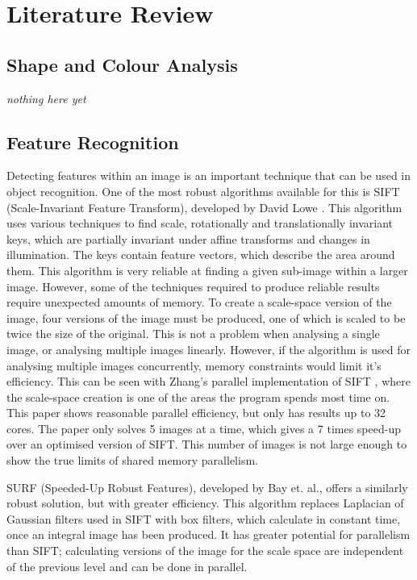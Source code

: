 \documentclass[../main.tex]{subfiles}
\begin{document}
  \section{Literature Review}
    \subsection{Shape and Colour Analysis}
      \textit{nothing here yet}
    \subsection{Feature Recognition}
      Detecting features within an image is an important technique that can be used in object recognition.
      One of the most robust algorithms available for this is SIFT (Scale-Invariant Feature Transform), developed by David Lowe \cite{sift}.
      This algorithm uses various techniques to find scale, rotationally and translationally invariant keys, which are partially invariant under affine transforms and changes in illumination.
      The keys contain feature vectors, which describe the area around them.
      This algorithm is very reliable at finding a given sub-image within a larger image.
      However, some of the techniques required to produce reliable results require unexpected amounts of memory.
      To create a scale-space version of the image, four versions of the image must be produced, one of which is scaled to be twice the size of the original.
      This is not a problem when analysing a single image, or analysing multiple images linearly.
      However, if the algorithm is used for analysing multiple images concurrently, memory constraints would limit it's efficiency.
      This can be seen with Zhang's parallel implementation of SIFT \cite{zhangsift}, where the scale-space creation is one of the areas the program spends most time on.
      This paper shows reasonable parallel efficiency, but only has results up to 32 cores.
      The paper only solves 5 images at a time, which gives a 7 times speed-up over an optimised version of SIFT.
      This number of images is not large enough to show the true limits of shared memory parallelism.

      SURF (Speeded-Up Robust Features), developed by Bay et. al.\cite{surf}, offers a similarly robust solution, but with greater efficiency.
      This algorithm replaces Laplacian of Gaussian filters used in SIFT with box filters, which calculate in constant time, once an integral image has been produced.
      It has greater potential for parallelism than SIFT; calculating versions of the image for the scale space are independent of the previous level and can be done in parallel.
      
    \biblio
\end{document}
